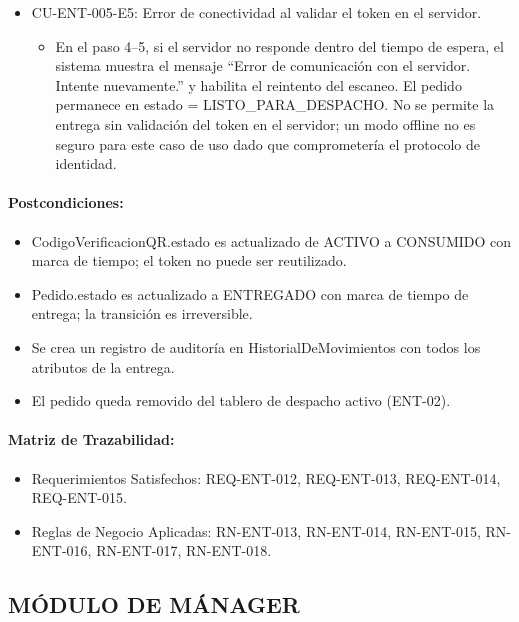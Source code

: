 \begin{itemize}
\begin{itemize}
    \end{itemize}
    \item CU-ENT-005-E5: Error de conectividad al validar el token en el servidor.
    \begin{itemize}
        \item En el paso 4--5, si el servidor no responde dentro del tiempo de espera, el sistema muestra el mensaje ``Error de comunicación con el servidor. Intente nuevamente.'' y habilita el reintento del escaneo. El pedido permanece en estado = LISTO\_PARA\_DESPACHO. No se permite la entrega sin validación del token en el servidor; un modo offline no es seguro para este caso de uso dado que comprometería el protocolo de identidad.
    \end{itemize}
\end{itemize}

\paragraph{Postcondiciones:}
\begin{itemize}
    \item CodigoVerificacionQR.estado es actualizado de ACTIVO a CONSUMIDO con marca de tiempo; el token no puede ser reutilizado.
    \item Pedido.estado es actualizado a ENTREGADO con marca de tiempo de entrega; la transición es irreversible.
    \item Se crea un registro de auditoría en HistorialDeMovimientos con todos los atributos de la entrega.
    \item El pedido queda removido del tablero de despacho activo (ENT-02).
\end{itemize}

\paragraph{Matriz de Trazabilidad:}
\begin{itemize}
    \item Requerimientos Satisfechos: REQ-ENT-012, REQ-ENT-013, REQ-ENT-014, REQ-ENT-015.
    \item Reglas de Negocio Aplicadas: RN-ENT-013, RN-ENT-014, RN-ENT-015, RN-ENT-016, RN-ENT-017, RN-ENT-018.
\end{itemize}

\subsection{MÓDULO DE MÁNAGER}
